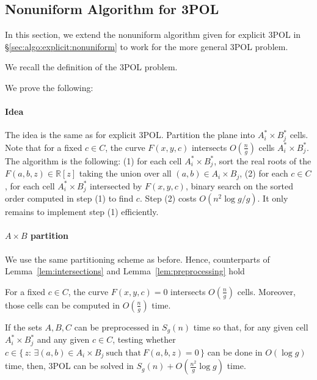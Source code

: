 \subsection{Nonuniform Algorithm for 3POL}%
\label{sec:algo:implicit:nonuniform}

In this section, we extend the nonuniform algorithm given for explicit 3POL in
\S\ref{sec:algo:explicit:nonuniform} to work for the more general 3POL
problem.

We recall the definition of the 3POL problem.
\ProblemPOLImplicit*

We prove the following:
\restate{\TheoremPOLNonuniformImplicit*}

\paragraph{Idea}
The idea is the same as for explicit 3POL\@. Partition the plane
into $A^*_i \times B^*_j$ cells.
Note that for a fixed $c \in C$, the curve $F(x,y,c)$ intersects $O(\frac ng)$
cells $A^*_i \times B^*_j$. The algorithm is the following: (1) for each cell
$A^*_i \times B^*_j$, sort the real roots of the $F(a,b,z)
\in \mathbb{R}[z]$ taking the union over all $(a,b) \in A_i \times B_j$,
(2) for each $c \in C$,
for each cell $A^*_i \times B^*_j$ intersected by $F(x,y,c)$, binary search on
the sorted order computed in step (1) to find $c$. Step (2) costs $O(n^2
\log g / g)$. It only remains to implement step (1) efficiently.

\paragraph{$A \times B$ partition}
We use the same partitioning scheme as before. Hence, counterparts of
Lemma~\ref{lem:intersections}
and
Lemma~\ref{lem:preprocessing}
hold
\begin{lemma}\label{lem:intersections-implicit}
    For a fixed \(c \in C\), the curve $F(x,y,c)=0$ intersects $O(\frac ng)$ cells.
    Moreover, those cells can be computed in $O(\frac ng)$ time.
\end{lemma}
\begin{lemma}\label{lem:preprocessing-implicit}
    If the sets $A,B,C$ can be preprocessed in $S_g(n)$ time so that,
    for any given cell $A^*_i \times B^*_j$ and any given $c \in C$, testing whether
    $c \in \{\, z \colon\, \exists(a,b) \in A_i \times B_j~\text{such that}~F(a,b,z) = 0\,\}$
    can be done in
    $O(\log g)$ time, then, 3POL can be solved in
    $S_g(n)+O(\frac{n^2}{g}\log g)$ time.
\end{lemma}

